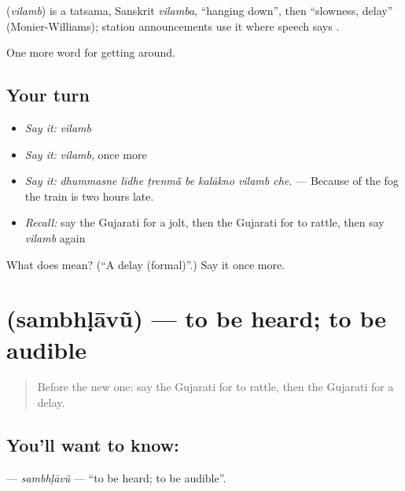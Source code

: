 \begin{cousinweb}
\textbf{} (\emph{vilamb}) is a tatsama, Sanskrit \emph{vilamba}, \textquotedblleft{}hanging down\textquotedblright{}, then \textquotedblleft{}slowness, delay\textquotedblright{} (Monier-Williams); station announcements use it where speech says .
\end{cousinweb}

\begin{grammarlens}[title={What you've built}]
One more word for getting around.
\end{grammarlens}

\subsection*{Your turn}
\begin{itemize}
\raggedright
  \item \emph{Say it:} \emph{vilamb}
  \item \emph{Say it:} \emph{vilamb}, once more
  \item \emph{Say it:} \emph{dhummasne līdhe ṭrenmā̃ be kalākno vilamb che.} — Because of the fog the train is two hours late.
  \item \emph{Recall:} say the Gujarati for a jolt, then the Gujarati for to rattle, then say \emph{vilamb} again
\end{itemize}

\begin{tcolorbox}[breakable,colback=teal!4,colframe=teal!35!black,title={Before you move on}]
What does  mean? (\textquotedblleft{}A delay (formal)\textquotedblright{}.) Say it once more.
\end{tcolorbox}
\section[\texorpdfstring{\gu{સંભળાવું} (sambhḷāvũ)}{સંભળાવું (sambhḷāvũ)}]{ (sambhḷāvũ) — to be heard; to be audible}

\label{lesson:GU-C399-sambhlavu}



\begin{quote}
Before the new one: say the Gujarati for to rattle, then the Gujarati for a delay.
\end{quote}

\subsection*{You'll want to know: }
\textbf{} — \emph{sambhḷāvũ} — \textquotedblleft{}to be heard; to be audible\textquotedblright{}.

